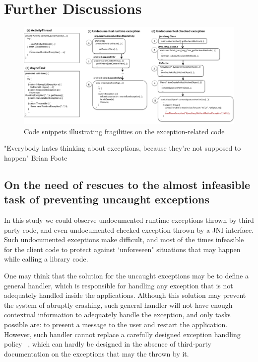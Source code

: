 \documentclass[conference]{IEEEtran}
\begin{document}
\noindent {}


\section{Further Discussions}
\label{sec:disc}

\begin{figure} \centering \includegraphics[scale=0.55]{examples_new2.png}
\caption{Code snippets illustrating fragilities on the exception-related code} \label{fig:snippets} \end{figure}

 "Everybody hates thinking about exceptions, because they’re not supposed to happen"
  Brian Foote


\subsection{On the need of rescues to the almost infeasible task of preventing uncaught exceptions}
In this study we could observe undocumented runtime exceptions thrown by third party code,
and even undocumented checked exception thrown by a JNI interface.
Such undocumented exceptions make difficult, and most of the times infeasible
for the client code to protect against `unforeseen" situations that may happen 
while calling a library code.

One may think that the solution for the uncaught exceptions may be to define a general handler, 
which is responsible for handling any exception that is not
adequately handled inside the applications. Although this 
solution may prevent  the system of abruptly crashing,
 such general handler will not have enough
contextual information to adequately handle the exception, 
and only tasks possible are: to present a message to the user
 and restart the application. However, such handler cannot replace a carefully designed exception 
handling policy ~\cite{Robil00}, which can hardly be designed in the absence of 
third-party documentation on the exceptions that
may the thrown by it.
\end{document}
